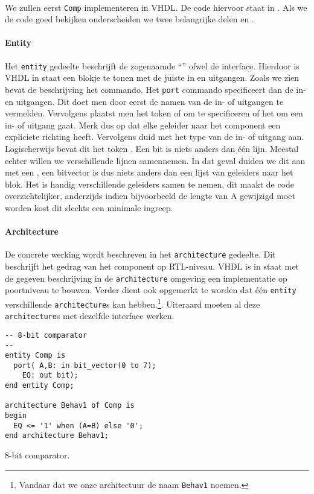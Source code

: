 \paragraph{}We zullen eerst \texttt{Comp} implementeren in VHDL. De code hiervoor staat in . Als we de code goed bekijken onderscheiden we twee belangrijke delen  en .
\paragraph{Entity}
Het \texttt{entity} gedeelte beschrijft de zogenaamde ``'' ofwel de interface. Hierdoor is VHDL in staat een blokje te tonen met de juiste in en uitgangen. Zoals we zien bevat de beschrijving het  commando. Het \texttt{port} commando specificeert dan de in- en uitgangen. Dit doet men door eerst de namen van de in- of uitgangen te vermelden. Vervolgens plaatst men het token  of  om te specificeren of het om een in- of uitgang gaat. Merk dus op dat elke geleider naar het component een expliciete richting heeft. Vervolgens duid met het type van de in- of uitgang aan. Logischerwijs bevat dit het token . Een bit is niets anders dan \'e\'en lijn. Meestal echter willen we verschillende lijnen samennemen. In dat geval duiden we dit aan met een , een bitvector is dus niets anders dan een lijst van geleiders naar het blok. Het is handig verschillende geleiders samen te nemen, dit maakt de code overzichtelijker, anderzijds indien bijvoorbeeld de lengte van A gewijzigd moet worden kost dit slechts een minimale ingreep.
\paragraph{Architecture}
De concrete werking wordt beschreven in het \texttt{architecture} gedeelte. Dit beschrijft het gedrag van het component op RTL-niveau. VHDL is in staat met de gegeven beschrijving in de \texttt{architecture} omgeving een implementatie op poortniveau te bouwen. Verder dient ook opgemerkt te worden dat \'e\'en \texttt{entity} verschillende \texttt{architecture}s kan hebben.\footnote{Vandaar dat we onze architectuur de naam \texttt{Behav1} noemen.}. Uiteraard moeten al deze \texttt{architecture}s met dezelfde interface werken.
\begin{vhdlcode}
\centering
\begin{lstlisting}
-- 8-bit comparator
--
entity Comp is
  port(	A,B: in bit_vector(0 to 7);
	EQ: out bit);
end entity Comp;

architecture Behav1 of Comp is
begin
  EQ <= '1' when (A=B) else '0';
end architecture Behav1;
\end{lstlisting}
\caption{8-bit comparator.}
\label{vhdl:comp}
\end{vhdlcode}
